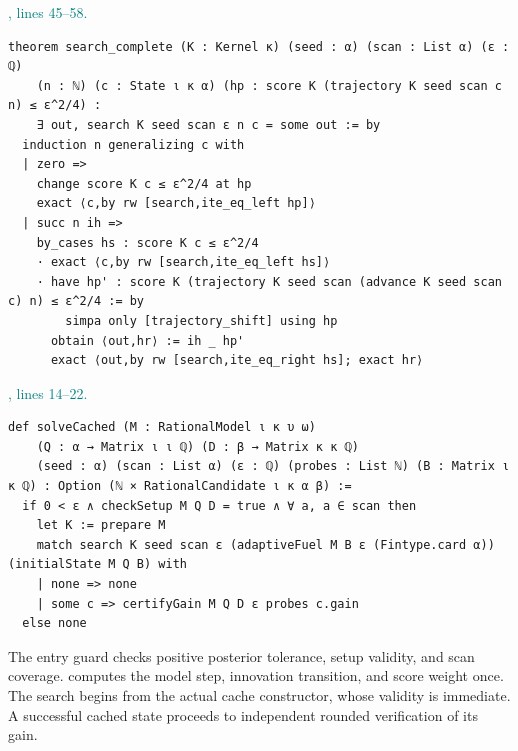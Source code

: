 \documentclass[11pt]{article}\usepackage{needspace}\renewcommand{\paperkind}{Lean companion}\setlength{\parskip}{0.35em}
\begin{document}


{\small\textcolor{teal}{, lines 45--58.}\par}

\begin{lstlisting}[style=BayesSource]
theorem search_complete (K : Kernel κ) (seed : α) (scan : List α) (ε : ℚ)
    (n : ℕ) (c : State ι κ α) (hp : score K (trajectory K seed scan c n) ≤ ε^2/4) :
    ∃ out, search K seed scan ε n c = some out := by
  induction n generalizing c with
  | zero =>
    change score K c ≤ ε^2/4 at hp
    exact ⟨c,by rw [search,ite_eq_left hp]⟩
  | succ n ih =>
    by_cases hs : score K c ≤ ε^2/4
    · exact ⟨c,by rw [search,ite_eq_left hs]⟩
    · have hp' : score K (trajectory K seed scan (advance K seed scan c) n) ≤ ε^2/4 := by
        simpa only [trajectory_shift] using hp
      obtain ⟨out,hr⟩ := ih _ hp'
      exact ⟨out,by rw [search,ite_eq_right hs]; exact hr⟩
\end{lstlisting}



{\small\textcolor{teal}{, lines 14--22.}\par}

\begin{lstlisting}[style=BayesSource]
def solveCached (M : RationalModel ι κ υ ω)
    (Q : α → Matrix ι ι ℚ) (D : β → Matrix κ κ ℚ)
    (seed : α) (scan : List α) (ε : ℚ) (probes : List ℕ) (B : Matrix ι κ ℚ) : Option (ℕ × RationalCandidate ι κ α β) :=
  if 0 < ε ∧ checkSetup M Q D = true ∧ ∀ a, a ∈ scan then
    let K := prepare M
    match search K seed scan ε (adaptiveFuel M B ε (Fintype.card α)) (initialState M Q B) with
    | none => none
    | some c => certifyGain M Q D ε probes c.gain
  else none
\end{lstlisting}

The entry guard checks positive posterior tolerance, setup validity, and scan coverage.  computes the model step, innovation transition, and score weight once. The search begins from the actual cache constructor, whose validity is immediate. A successful cached state proceeds to independent rounded verification of its gain.
\end{document}
